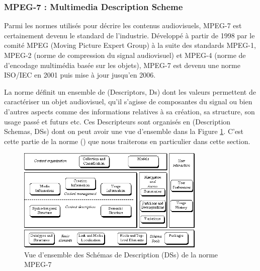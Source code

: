 \subsubsection{MPEG-7 : Multimedia Description Scheme}\label{sec:mpeg7}

Parmi les normes utilisés pour décrire les contenus audiovisuels, MPEG-7 est certainement devenu le standard de l'industrie. 
Développé à partir de 1998 par le comité MPEG (Moving Picture Expert Group) à la suite des standards MPEG-1, MPEG-2 (norme de compression du signal audiovisuel) et MPEG-4 (norme de d'encodage multimédia basée sur les objets), MPEG-7 est devenu une norme ISO/IEC en 2001 puis mise à jour jusqu'en 2006. 

La norme définit un ensemble de  (Descriptors, Ds) dont les valeurs permettent de caractériser un objet audiovisuel, qu'il s'agisse de composantes du signal ou bien d'autres aspects comme des informations relatives à sa création, sa structure, son usage passé et futurs etc.
Ces Descripteurs sont organisés en  (Description Schemas, DSs) dont on peut avoir une vue d'ensemble dans la Figure \ref{img:soa:mds}.
C'est cette partie de la norme (\cite[Part 5 : Multimedia Description Scheme]{ISO/IEC2003}) que nous traiterons en particulier dans cette section. 

\begin{figure}[ht!]
\centering
\includegraphics[width=0.8\textwidth]{images/MPEG-7-MDS.png}
\caption{Vue d'ensemble des Schémas de Description (DSs) de la norme MPEG-7}
\label{img:soa:mds}
\end{figure}


